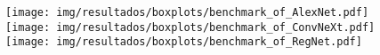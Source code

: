 \begin{figure}[h!]
	\texttt{[image: img/resultados/boxplots/benchmark\_of\_AlexNet.pdf]}
	\texttt{[image: img/resultados/boxplots/benchmark\_of\_ConvNeXt.pdf]}
	\texttt{[image: img/resultados/boxplots/benchmark\_of\_RegNet.pdf]}
	\caption{}
	\label{fig:Time_of_Diverse}
\end{figure}
